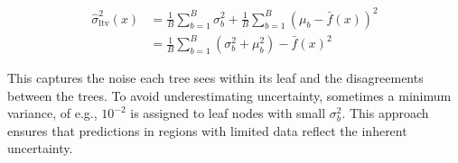\begin{align*}
\hat{\sigma}_{\mathrm{ltv}}^2(x) &=\frac{1}{B} \sum_{b=1}^{B} \sigma_b^2
+ \frac{1}{B}\sum_{b=1}^{B}\left(\mu_b-\bar{f}(x)\right)^2\\
&=\frac{1}{B} \sum_{b=1}^{B} \left(\sigma_b^2 + \mu_b^2\right)-\bar{f}(x)^2
\end{align*}

This captures the noise each tree sees within its leaf and the disagreements between the trees.
To avoid underestimating uncertainty, sometimes a minimum variance, of e.g., $10^{-2}$ is assigned to leaf nodes with small $\sigma_b^2$.
This approach ensures that predictions in regions with limited data reflect the inherent uncertainty.

